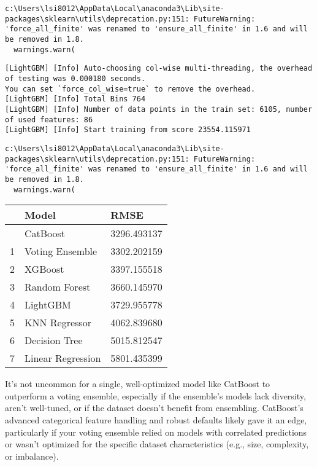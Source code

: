\documentclass[
  letterpaper,
  DIV=11,
  numbers=noendperiod]{scrreprt}
\begin{document}
\begin{verbatim}
c:\Users\lsi8012\AppData\Local\anaconda3\Lib\site-packages\sklearn\utils\deprecation.py:151: FutureWarning: 'force_all_finite' was renamed to 'ensure_all_finite' in 1.6 and will be removed in 1.8.
  warnings.warn(
\end{verbatim}

\begin{verbatim}
[LightGBM] [Info] Auto-choosing col-wise multi-threading, the overhead of testing was 0.000180 seconds.
You can set `force_col_wise=true` to remove the overhead.
[LightGBM] [Info] Total Bins 764
[LightGBM] [Info] Number of data points in the train set: 6105, number of used features: 86
[LightGBM] [Info] Start training from score 23554.115971
\end{verbatim}

\begin{verbatim}
c:\Users\lsi8012\AppData\Local\anaconda3\Lib\site-packages\sklearn\utils\deprecation.py:151: FutureWarning: 'force_all_finite' was renamed to 'ensure_all_finite' in 1.6 and will be removed in 1.8.
  warnings.warn(
\end{verbatim}

\begin{longtable}[]{@{}lll@{}}
\toprule\noalign{}
& Model & RMSE \\
\midrule\noalign{}
\endhead
\bottomrule\noalign{}
\endlastfoot
0 & CatBoost & 3296.493137 \\
1 & Voting Ensemble & 3302.202159 \\
2 & XGBoost & 3397.155518 \\
3 & Random Forest & 3660.145970 \\
4 & LightGBM & 3729.955778 \\
5 & KNN Regressor & 4062.839680 \\
6 & Decision Tree & 5015.812547 \\
7 & Linear Regression & 5801.435399 \\
\end{longtable}

It's not uncommon for a single, well-optimized model like CatBoost to
outperform a voting ensemble, especially if the ensemble's models lack
diversity, aren't well-tuned, or if the dataset doesn't benefit from
ensembling. CatBoost's advanced categorical feature handling and robust
defaults likely gave it an edge, particularly if your voting ensemble
relied on models with correlated predictions or wasn't optimized for the
specific dataset characteristics (e.g., size, complexity, or imbalance).
\end{document}
